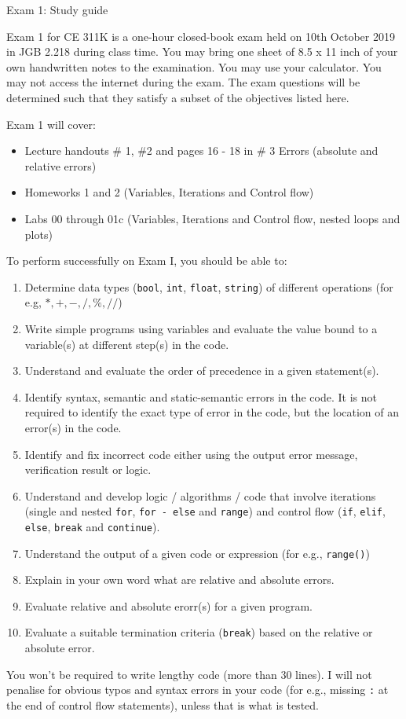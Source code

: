 \documentclass[]{article}
\begin{document}
\begin{center}
\Large Exam 1: Study guide
\end{center}

Exam 1 for CE 311K is a one-hour closed-book exam held on 10th October 2019 in JGB 2.218 during class time. You may bring one sheet of 8.5 x 11 inch of your own handwritten notes to the examination. You may use your calculator. You may not access the internet during the exam. The exam questions will be determined such that they satisfy a subset of the objectives listed here.

Exam 1 will cover:
\begin{itemize}
	\item Lecture handouts \# 1, \#2 and pages 16 - 18 in \# 3 Errors (absolute and relative errors)
	\item Homeworks 1 and 2 (Variables, Iterations and Control flow)
	\item Labs 00 through 01c (Variables, Iterations and Control flow, nested loops and plots)
\end{itemize}

To perform successfully on Exam I, you should be able to:

\begin{enumerate}
	\item Determine data types (\verb|bool|, \verb|int|, \verb|float|, \verb|string|) of different operations (for e.g, $*, +, -, /, \%, //$)
	\item Write simple programs using variables and evaluate the value bound to a variable(s) at different step(s) in the code.
	\item Understand and evaluate the order of precedence in a given statement(s).
	\item Identify syntax, semantic and static-semantic errors in the code. It is not required to identify the exact type of error in the code, but the location of an error(s) in the code.
	\item Identify and fix incorrect code either using the output error message, verification result or logic.
	\item Understand and develop logic / algorithms / code that involve iterations (single and nested \verb|for|, \verb|for - else| and \verb|range|) and control flow (\verb|if|, \verb|elif|, \verb|else|, \verb|break| and \verb|continue|).
	\item Understand the output of a given code or expression (for e.g., \verb|range()|)
	\item Explain in your own word what are relative and absolute errors.
	\item Evaluate relative and absolute erorr(s) for a given program. 
	\item Evaluate a suitable termination criteria (\verb|break|) based on the relative or absolute error.


\end{enumerate}

You won't be required to write lengthy code (more than 30 lines). I will not penalise for obvious typos and syntax errors in your code (for e.g., missing \verb|:| at the end of control flow statements), unless that is what is tested.
\end{document}
